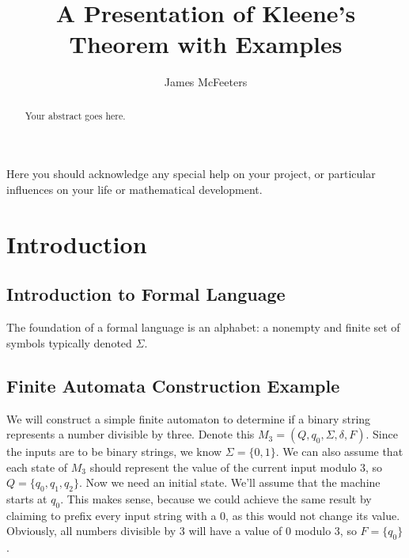 \documentclass{bcthesis}
\title{A Presentation of Kleene's Theorem with Examples}
\author{James McFeeters}
\begin{document}
\frontmatter

\maketitle

\begin{abstract}
	Your abstract goes here.
\end{abstract}



\begin{acknowledgments}
	Here you should acknowledge any special help on your project, or particular influences on your life or mathematical development.
\end{acknowledgments}


\tableofcontents


\mainmatter

\chapter{Introduction}%
\label{ch:introduction}

	\section{Introduction to Formal Language} %
	\label{sec:introduction_to_formal_language}
		The foundation of a formal language is an alphabet: a nonempty and finite set of symbols typically denoted $\Sigma$.



	\section{Finite Automata Construction Example} %
	\label{sec:finite_automata_construction_example}
		We will construct a simple finite automaton to determine if a binary string represents a number divisible by three.
		Denote this $M_3 = (Q, q_0, \Sigma, \delta, F)$.
		Since the inputs are to be binary strings, we know $\Sigma = \{ 0, 1 \}$.
		We can also assume that each state of $M_3$ should represent the value of the current input modulo 3, so $Q = \{q_0, q_1, q_2\}$.
		Now we need an initial state. 
		We'll assume that the machine starts at $q_0$. 
		This makes sense, because we could achieve the same result by claiming to prefix every input string with a 0, as this would not change its value.
		Obviously, all numbers divisible by 3 will have a value of 0 modulo 3, so $F = \{q_0\}$.
\end{document}
